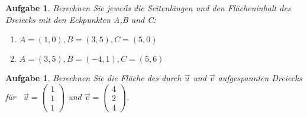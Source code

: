 \documentclass[12pt]{article}
\newtheorem{exercise}[satz]{Aufgabe}
\begin{document}
\vspace{0.1cm} 
   

\begin{exercise}
  Berechnen Sie jeweils die Seitenl\"angen und den Fl\"acheninhalt des Dreiecks mit den Eckpunkten A,B und C:
    \begin{enumerate}
      \item[(a)] $A=(1,0),B=(3,5),C=(5,0)$
      \item[(b)] $A=(3,5),B=(-4,1),C=(5,6)$
    \end{enumerate}
\end{exercise}

\vspace{0.1cm} 

\begin{exercise}
  Berechnen Sie die Fl\"ache des durch $\vec{u}$ und $\vec{v}$ aufgespannten Dreiecks f\"ur \,
  $\vec{u}=\left(\begin{array}{r} 1 \\ 1 \\ 1 \end{array}\right)$ und
  $\vec{v}=\left(\begin{array}{r} 4 \\ 2 \\ 4 \end{array}\right)$.
\end{exercise}
   
 
   
\end{document}
